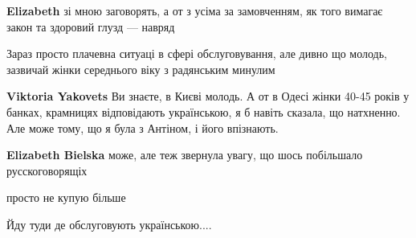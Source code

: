 \begin{itemize}
\begin{itemize}
\textbf{Elizabeth} зі мною заговорять, а от з усіма за замовченням, як того вимагає закон та здоровий глузд — навряд
\end{itemize}

 
Зараз просто плачевна ситуаці в сфері обслуговування, але дивно що молодь,
зазвичай жінки середнього віку з радянським минулим

\begin{itemize}
 
\textbf{Viktoria Yakovets} Ви знаєте, в Києві молодь. А от в Одесі жінки 40-45
років у банках, крамницях відповідають українською, я б навіть сказала, що
натхненно. Але може тому, що я була з Антіном, і його впізнають.

 
\textbf{Elizabeth Bielska} може, але теж звернула увагу, що шось побільшало
русскоговорящіх
\end{itemize}

 
просто не купую більше

 
Йду туди де обслуговують українською....

\begin{itemize}
 

\end{itemize}
\end{itemize}
